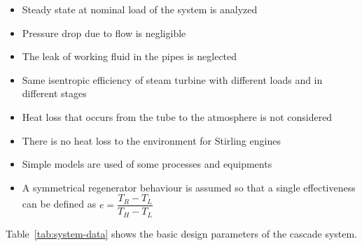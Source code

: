 \documentclass{article}
\begin{document}
\begin{itemize}
	\item Steady state at nominal load of the system is analyzed
	\item Pressure drop due to flow is negligible
	\item The leak of working fluid in the pipes is neglected
	\item Same isentropic efficiency of steam turbine with different loads and in different stages
	\item Heat loss that occurs from the tube to the atmosphere is not considered
	\item There is no heat loss to the environment for Stirling engines
	\item Simple models are used of some processes and equipments
	\item A symmetrical regenerator behaviour is assumed so that a single effectiveness can be defined as $e=\dfrac{T_R - T_L}{T_H - T_L}$~\cite{Formosa2010,Juhasz2010}
\end{itemize}

Table~\ref{tab:system-data} shows the basic design parameters of the cascade system.
\end{document}
